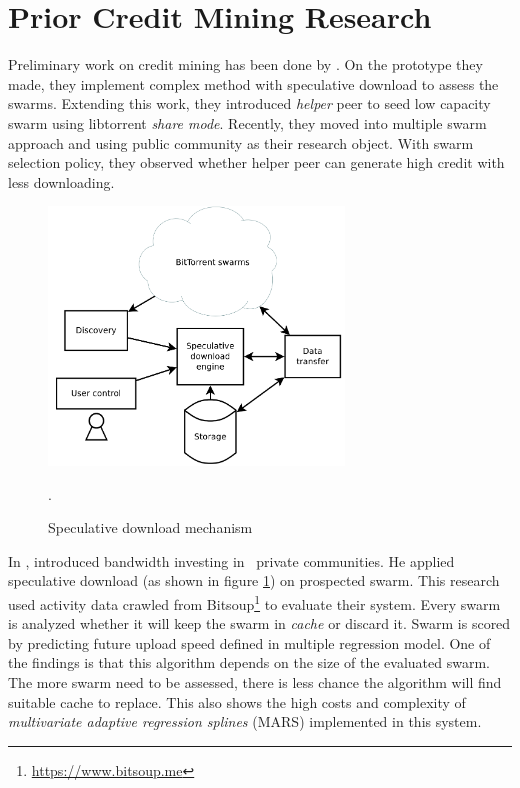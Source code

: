 \section{Prior Credit Mining Research}
\label{section:cmprior}
Preliminary work on credit mining has been done by \citeauthor{2015:creditmining:capota} \cite{2015:creditmining:capota, 2013:investmentcm:capota, 2014:bwmarket:capota}. On the prototype they made, they implement complex method with speculative download to assess the swarms\cite{2013:investmentcm:capota}. Extending this work, they introduced \textit{helper} peer to seed low capacity swarm using libtorrent \textit{share mode}\cite{2014:bwmarket:capota}. Recently, they moved into multiple swarm approach and using public community as their research object. With swarm selection policy, they observed whether helper peer can generate high credit with less downloading\cite{2015:creditmining:capota}.

\begin{figure}[ht]
	\centering
	\includegraphics[width=0.7\textwidth]{pics/SDE2013.png}
	\caption{Speculative download mechanism \cite{2013:investmentcm:capota}}.
	\label{fig:sde13}
\end{figure}

In \citeyear{2013:investmentcm:capota}, \citeauthor{2013:investmentcm:capota} introduced bandwidth investing in \bt~private communities. He applied speculative download (as shown in figure \ref{fig:sde13}) on prospected swarm. This research used activity data crawled from Bitsoup\footnote{\url{https://www.bitsoup.me}} to evaluate their system. Every swarm is analyzed whether it will keep the swarm in \textit{cache} or discard it. Swarm is scored by predicting future upload speed defined in multiple regression model\cite{2013:investmentcm:capota}. One of the findings is that this algorithm depends on the size of the evaluated swarm. The more swarm need to be assessed, there is less chance the algorithm will find suitable cache to replace. This also shows the high costs and complexity of \textit{multivariate adaptive regression splines} (MARS) implemented in this system.

